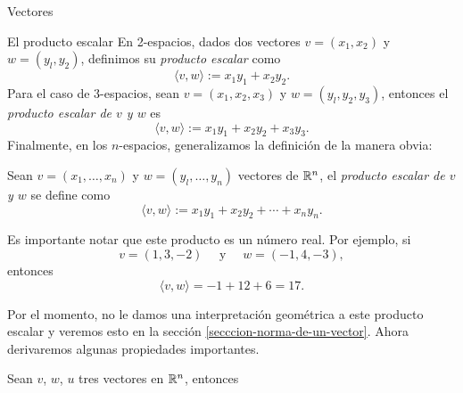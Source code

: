 \begin{chapter}{Vectores}
\begin{section}{El producto escalar}
        En 2-espacios, dados dos vectores $v = (x_1, x_2)$ y $w= (y_l, y_2)$, definimos su \textit{producto escalar} como
        \begin{equation*}
            \langle v , w  \rangle :=x_1y_1 + x_2y_2.
        \end{equation*}
        Para el caso de 3-espacios, sean   $v = (x_1, x_2,x_3)$ y $w= (y_l, y_2,y_3)$,  entonces el \textit{producto escalar de $v$ y $w$} es
        \begin{equation*}
            \langle v , w  \rangle :=x_1y_1 + x_2y_2+x_3y_3.
        \end{equation*}
        Finalmente, en los $n$-espacios,  generalizamos la definición de la manera obvia: 
        
        \begin{definicion}
            Sean  $v = (x_1, \ldots,x_n)$ y $w= (y_l, \ldots,y_n)$ vectores de $\mathbb R^n$,  el \textit{producto escalar de $v$ y $w$} se define como		
            \begin{equation*}
            \langle v , w \rangle :=x_1y_1 + x_2y_2+\cdots+x_ny_n.
            \end{equation*}
        \end{definicion}
        
        
        
        Es importante notar  que este producto es un número real. Por ejemplo, si
        \begin{equation*}
            v= (1, 3, - 2) \quad\text{ y } \quad w= (- 1, 4, - 3),
        \end{equation*}
        entonces
        \begin{equation*}
            \langle v , w \rangle= - 1 + 12 + 6 = 17.
        \end{equation*}
        
        Por el momento, no le damos una interpretación geométrica a este producto escalar y veremos esto en la sección \ref{secccion-norma-de-un-vector}. Ahora derivaremos algunas propiedades importantes.
        
        \begin{proposicion}
           Sean $v$, $w$, $u$  tres vectores en $\mathbb R^n$, entonces
     

\end{proposicion}
\end{section}
\end{chapter}
